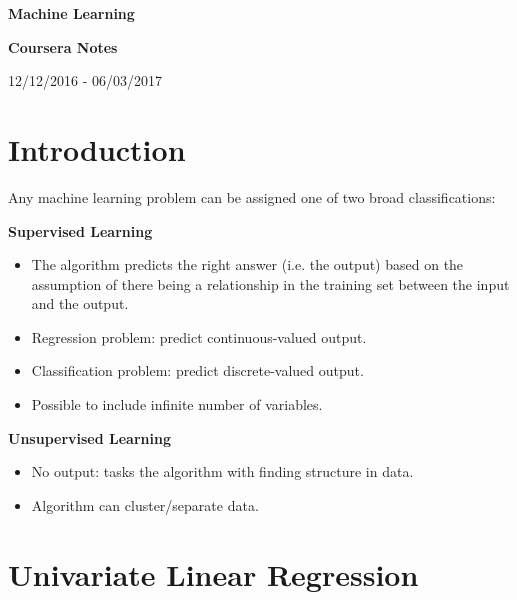 \documentclass[12pt, a4paper]{article}
\begin{document}
\begin{titlepage}
  \centering
  \vspace*{10cm}
  {\huge\bfseries Machine Learning} 
  
  {\large\bfseries Coursera Notes}

  {12/12/2016 - 06/03/2017}
\end{titlepage}

  \newpage

\tableofcontents


  \newpage

  
\section{Introduction} 

  Any machine learning problem can be assigned one of two broad 
  classifications:

  \textbf{Supervised Learning}
  \begin{itemize}
    \item The algorithm predicts the right answer (i.e. the output) 
      based on the assumption of there being a relationship in the 
      training set between the input and the output.
    \item Regression problem: predict continuous-valued output.
    \item Classification problem: predict discrete-valued output.
    \item Possible to include infinite number of variables.
  \end{itemize}

  \textbf{Unsupervised Learning}
  \begin{itemize}
    \item No output: tasks the algorithm with finding structure in 
      data.
    \item Algorithm can cluster/separate data.
  \end{itemize}

  \newpage
	

\section{Univariate Linear Regression}
 
\end{document}
